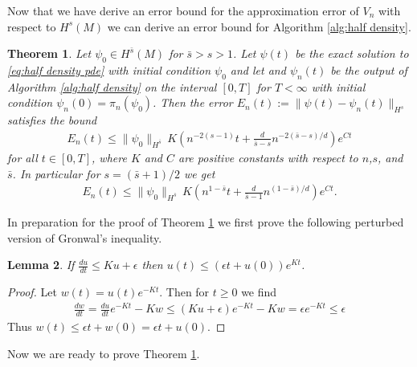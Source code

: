 \documentclass[final,leqno]{siamltex1213}
\newtheorem{thm}{Theorem}[section]
\newtheorem{lem}[thm]{Lemma}
\begin{document}

Now that we have derive an error bound for the approximation error of $V_{n}$ with respect to $H^{s}(M)$ we can 
derive an error bound for Algorithm \ref{alg:half density}.


\begin{thm} \label{thm:half density convergence}
	Let $\psi_{0} \in H^{\bar{s}}(M)$ for $\bar{s} > s > 1$.
	Let $\psi(t)$ be the exact solution to \eqref{eq:half density pde} with initial condition $\psi_{0}$ and let
	and $\psi_{n}(t)$ be the output of Algorithm \ref{alg:half density} on the interval $[0,T]$ for $T < \infty$ with initial condition $\psi_{n}(0) = \pi_{n}(\psi_{0})$.
	Then the error $E_{n}(t) := \| \psi(t) - \psi_{n}(t) \|_{H^{s}}$ satisfies the bound
	\begin{align}
		E_{n}(t) \leq \| \psi_{0} \|_{H^{\bar{s}}} \, K \left( n^{-2(s-1)} t+  \frac{d}{\bar{s}-s} n^{-2(\bar{s}-s)/d} \right) e^{C t}
	\end{align}
	for all $t \in [0,T]$, where $K$ and $C$ are positive constants with respect to $n$,$s$, and $\bar{s}$.
	In particular for $s = (\bar{s}+1)/2$ we get
	\begin{align}
			E_{n}(t) \leq \| \psi_{0} \|_{H^{\bar{s}}} \, K \left( n^{1-\bar{s}} t+  \frac{d}{\bar{s}-1} n^{(1-\bar{s})/d} \right) e^{C t}.
	\end{align}
\end{thm}

In preparation for the proof of Theorem \ref{thm:half density convergence} we first prove the following perturbed version of Gronwal's inequality.

\begin{lem} \label{lem:Gronwall}
If $\frac{du}{dt} \leq Ku + \epsilon$ then $u(t) \leq (\epsilon t + u(0) ) e^{Kt}$.
\end{lem}
\begin{proof}
	Let $w (t)= u (t) e^{-Kt}$.  Then for $t \geq 0$ we find
	\begin{align}
		\frac{dw}{dt} = \frac{du}{dt} e^{-Kt} - K w \leq (Ku+\epsilon) e^{-Kt} - Kw = \epsilon e^{-Kt} \leq \epsilon
	\end{align}
	Thus $w(t) \leq \epsilon t + w(0) = \epsilon t + u(0)$.
\end{proof}

Now we are ready to prove Theorem \ref{thm:half density convergence}.
\end{document}
